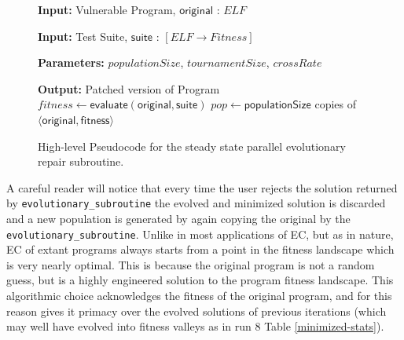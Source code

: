 \documentclass{sigcomm-alternate}
\begin{document}
\begin{figure}[H]
\begin{algorithmic}[1]
\small
\item[{\textbf{Input: }} {Vulnerable Program, $\mathsf{original}$ : $ELF$}]
\item[{\textbf{Input: }} {Test Suite, $\mathsf{suite}$ : $[ELF \rightarrow Fitness]$}]
\item[{\textbf{Parameters: }} {$populationSize$, $tournamentSize$, $crossRate$}]
\item[{\textbf{Output: }} {Patched version of Program}] 
   $fitness \leftarrow \mathsf{evaluate}(\mathsf{original}, \mathsf{suite})$ 
   $pop \leftarrow \mathsf{populationSize}$ copies of $\langle \mathsf{original}, \mathsf{fitness} \rangle$
\end{algorithmic}
\caption{\label{evolutionary-subroutine}High-level Pseudocode for the
steady state parallel evolutionary repair subroutine.}
\end{figure}

A careful reader will notice that every time the user rejects the
solution returned by \texttt{evolutionary\_subroutine} the evolved and
minimized solution is discarded and a new population is generated by
again copying the original by the \texttt{evolutionary\_subroutine}.  Unlike
in most applications of EC, but as in nature, EC of extant programs
always starts from a point in the fitness landscape which is very
nearly optimal.  This is because the original program is not a random
guess, but is a highly engineered solution to the program fitness
landscape.  This algorithmic choice acknowledges the fitness of the
original program, and for this reason gives it primacy over the
evolved solutions of previous iterations (which may well have evolved
into fitness valleys as in run 8 Table \ref{minimized-stats}).
\end{document}
